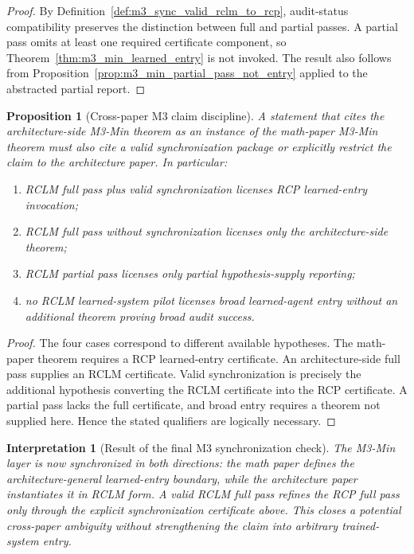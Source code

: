 \documentclass[11pt]{article}
\newtheorem{proposition}[theorem]{Proposition}
\newtheorem{interpretation}[theorem]{Interpretation}
\newcommand{\1}{\mathbf{1}}
\begin{document}
\begin{proof}
By Definition~\ref{def:m3_sync_valid_rclm_to_rcp}, audit-status compatibility preserves the distinction between full and partial passes.  A partial pass omits at least one required certificate component, so Theorem~\ref{thm:m3_min_learned_entry} is not invoked.  The result also follows from Proposition~\ref{prop:m3_min_partial_pass_not_entry} applied to the abstracted partial report.
\end{proof}

\begin{proposition}[Cross-paper M3 claim discipline]
\label{prop:m3_sync_cross_paper_claim_discipline}
A statement that cites the architecture-side M3-Min theorem as an instance of the math-paper M3-Min theorem must also cite a valid synchronization package or explicitly restrict the claim to the architecture paper.  In particular:
\begin{enumerate}[label=(\roman*),leftmargin=1.5em]
    \item RCLM full pass plus valid synchronization licenses RCP learned-entry invocation;
    \item RCLM full pass without synchronization licenses only the architecture-side theorem;
    \item RCLM partial pass licenses only partial hypothesis-supply reporting;
    \item no RCLM learned-system pilot licenses broad learned-agent entry without an additional theorem proving broad audit success.
\end{enumerate}
\end{proposition}

\begin{proof}
The four cases correspond to different available hypotheses.  The math-paper theorem requires a RCP learned-entry certificate.  An architecture-side full pass supplies an RCLM certificate.  Valid synchronization is precisely the additional hypothesis converting the RCLM certificate into the RCP certificate.  A partial pass lacks the full certificate, and broad entry requires a theorem not supplied here.  Hence the stated qualifiers are logically necessary.
\end{proof}

\begin{interpretation}[Result of the final M3 synchronization check]
The M3-Min layer is now synchronized in both directions: the math paper defines the architecture-general learned-entry boundary, while the architecture paper instantiates it in RCLM form.  A valid RCLM full pass refines the RCP full pass only through the explicit synchronization certificate above.  This closes a potential cross-paper ambiguity without strengthening the claim into arbitrary trained-system entry.
\end{interpretation}
\end{document}
